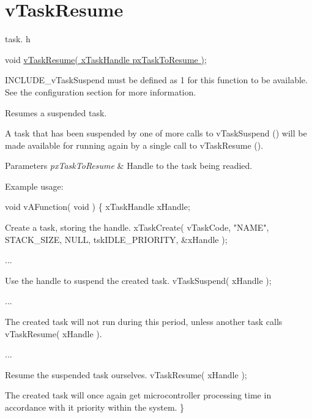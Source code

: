 \hypertarget{group__v_task_resume}{\section{v\-Task\-Resume}
\label{group__v_task_resume}
}
task. h 
\begin{DoxyPre}void \hyperlink{tasks_8c_a335663a0881a38ebb6d98c884c84e398}{vTaskResume( xTaskHandle pxTaskToResume )};\end{DoxyPre}


I\-N\-C\-L\-U\-D\-E\-\_\-v\-Task\-Suspend must be defined as 1 for this function to be available. See the configuration section for more information.

Resumes a suspended task.

A task that has been suspended by one of more calls to v\-Task\-Suspend () will be made available for running again by a single call to v\-Task\-Resume ().


\begin{DoxyParams}{Parameters}
{\em px\-Task\-To\-Resume} & Handle to the task being readied.\\
\hline
\end{DoxyParams}
Example usage\-: 
\begin{DoxyPre}
 void vAFunction( void )
 \{
 xTaskHandle xHandle;\end{DoxyPre}



\begin{DoxyPre}Create a task, storing the handle.
     xTaskCreate( vTaskCode, "NAME", STACK\_SIZE, NULL, tskIDLE\_PRIORITY, \&xHandle );\end{DoxyPre}



\begin{DoxyPre}...\end{DoxyPre}



\begin{DoxyPre}Use the handle to suspend the created task.
     vTaskSuspend( xHandle );\end{DoxyPre}



\begin{DoxyPre}...\end{DoxyPre}



\begin{DoxyPre}The created task will not run during this period, unless
another task calls vTaskResume( xHandle ).\end{DoxyPre}



\begin{DoxyPre}...\end{DoxyPre}



\begin{DoxyPre}Resume the suspended task ourselves.
     vTaskResume( xHandle );\end{DoxyPre}



\begin{DoxyPre}The created task will once again get microcontroller processing
time in accordance with it priority within the system.
 \}
   \end{DoxyPre}
 